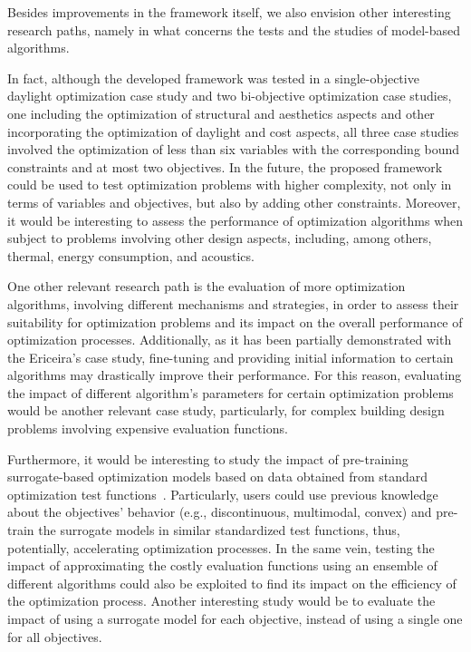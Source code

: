 Besides improvements in the framework itself, we also envision other interesting research paths, namely in what concerns the tests and the studies of model-based algorithms. 

In fact, although the developed framework was tested in a single-objective daylight optimization case study and two bi-objective optimization case studies, one including the optimization of structural and aesthetics aspects and other incorporating the optimization of daylight and cost aspects, all three case studies involved the optimization of less than six variables with the corresponding bound constraints and at most two objectives. In the future, the proposed framework could be used to test optimization problems with higher complexity, not only in terms of variables and objectives, but also by adding other constraints. Moreover, it would be interesting to assess the performance of optimization algorithms when subject to problems involving other design aspects, including, among others, thermal, energy consumption, and acoustics. 
 
One other relevant research path is the evaluation of more optimization algorithms, involving different mechanisms and strategies, in order to assess their suitability for optimization problems and its impact on the overall performance of optimization processes. Additionally, as it has been partially demonstrated with the Ericeira's case study, fine-tuning and providing initial information to certain algorithms may drastically improve their performance. For this reason, evaluating the impact of different algorithm's parameters for certain optimization problems would be another relevant case study, particularly, for complex building design problems involving expensive evaluation functions. 

Furthermore, it would be interesting to study the impact of pre-training surrogate-based optimization models based on data obtained from standard optimization test functions~\cite{Zhang2009TEST}. Particularly, users could use previous knowledge about the objectives' behavior (e.g., discontinuous, multimodal, convex) and pre-train the surrogate models in similar standardized test functions, thus, potentially, accelerating optimization processes. In the same vein, testing the impact of approximating the costly evaluation functions using an ensemble of different algorithms could also be exploited to find its impact on the efficiency of the optimization process. %
Another interesting study would be to evaluate the impact of using a surrogate model for each objective, instead of using a single one for all objectives. 
